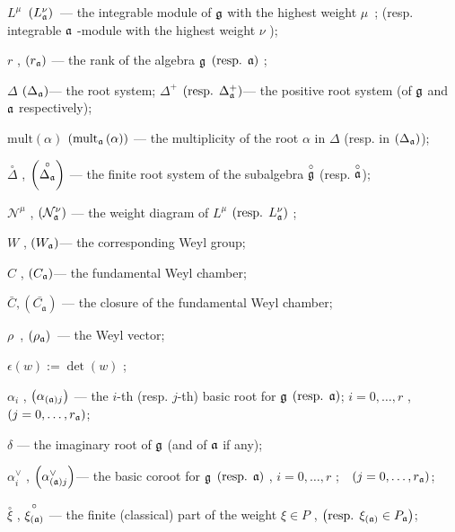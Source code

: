 \documentclass[a4paper,12pt]{article}
\theoremstyle{definition} \newtheorem{Def}{Definition}
\begin{document}
$L^{\mu }$\ $\left( L_{\frak{a}}^{\nu }\right) $\ --- the integrable module
of $\frak{g}$ with the highest weight $\mu $\ ; (resp. integrable $\frak{a}$
-module with the highest weight $\nu $ );

$r$ , $\left( r_{\frak{a}}\right) $ --- the rank of the algebra $\frak{g}$ $%
\left( \text{resp. }\frak{a}\right) $ ;

$\Delta $ $\left( \Delta _{\frak{a}}\right) $--- the root system; $\Delta
^{+} $ $\left( \text{resp. }\Delta _{\frak{a}}^{+}\right) $--- the positive
root system (of $\frak{g}$ and $\frak{a}$ respectively);

$\mathrm{mult}\left( \alpha \right) $ $\left( \mathrm{mult}_{\frak{a}}\left(
\alpha \right) \right) $ --- the multiplicity of the root $\alpha$ in $\Delta 
$ (resp. in $\left( \Delta _{\frak{a}}\right) $);

$\overset{\circ }{\Delta }$ , $\left( \overset{\circ }{\Delta _{\frak{a}}}%
\right) $ --- the finite root system of the subalgebra $\overset{\circ }{%
\frak{g}}$ (resp. $\overset{\circ }{\frak{a}}$);

$\mathcal{N}^{\mu }$ , $\left( \mathcal{N}_{\frak{a}}^{\nu }\right) $ --- the
weight diagram of $L^{\mu }$ $\left( \text{resp. }L_{\frak{a}}^{\nu }\right) 
$ ;

$W$ , $\left( W_{\frak{a}}\right) $--- the corresponding Weyl group;

$C$ , $\left( C_{\frak{a}}\right) $--- the fundamental Weyl chamber;

$\bar{C}, \left(\bar{C_{\mathfrak{a}}}\right)$ --- the closure of the fundamental Weyl chamber;

$\rho $\ , $\left( \rho _{\frak{a}}\right) $\ --- the Weyl vector;

$\epsilon \left( w\right) :=\det \left( w\right) $ ;

$\alpha _{i}$ , $\left( \alpha _{\left( \frak{a}\right) j}\right) $ --- the $i
$-th (resp. $j$-th) basic root for $\frak{g}$ $\left( \text{resp. }\frak{a}%
\right) $; $i=0,\ldots ,r$ ,\ \ $\left( j=0,\ldots ,r_{\frak{a}}\right) $;

$\delta $ --- the imaginary root of $\frak{g}$ (and of $\frak{a}$ if any);

$\alpha _{i}^{\vee }$ , $\left( \alpha _{\left( \frak{a}\right) j}^{\vee
}\right) $--- the basic coroot for $\frak{g}$ $\left( \text{resp. }\frak{a}%
\right) $ , $i=0,\ldots ,r$ ;\ \ $\left( j=0,\ldots ,r_{\frak{a}}\right) $;

$\overset{\circ }{\xi }$ , $\overset{\circ }{\xi _{\left( \frak{a}\right) }}$
--- the finite (classical) part of the weight $\xi \in P$ , $\left( \text{%
resp. }\xi _{\left( \frak{a}\right) }\in P_{\frak{a}}\right) $;
\end{document}
